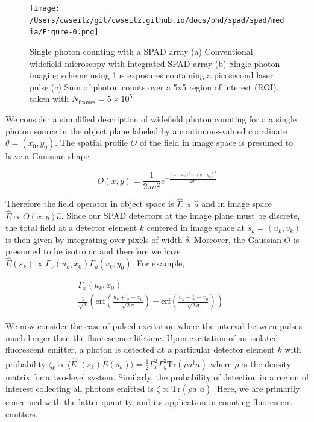 \begin{figure}[t]
\centering
\texttt{[image: /Users/cwseitz/git/cwseitz.github.io/docs/phd/spad/spad/media/Figure-0.png]}
\caption{Single photon counting with a SPAD array (a) Conventional widefield microscopy with integrated SPAD array (b) Single photon imaging scheme using 1us exposures containing a picosecond laser pulse (c) Sum of photon counts over a 5x5 region of interest (ROI), taken with $N_{\mathrm{frames}}=5\times 10^{5}$}
\end{figure}    

We consider a simplified description of widefield photon counting for a a single photon source in the object plane labeled by a continuous-valued coordinate $\theta=(x_0,y_0)$. The spatial profile $O$ of the field in image space is presumed to have a Gaussian shape \parencite{Zhang2007,Richards1959,Gibson1989}.

\begin{equation}
O(x,y) = \frac{1}{2\pi\sigma^{2}}e^{-\frac{(x-x_{0})^2+(y-y_{0})^2}{2\sigma^2}}
\end{equation}

Therefore the field operator in object space is $\hat{E} \propto \hat{a}$ and in image space $\hat{E} \propto O(x,y)\hat{a}$. Since our SPAD detectors at the image plane must be discrete, the total field at a detector element $k$ centered in image space at $s_k=(u_k,v_k)$ is then given by integrating over pixels of width $\delta$. Moreover, the Gaussian $O$ is presumed to be isotropic and therefore we have $\hat{E}(s_k) \propto \Gamma_{x}(u_k,x_{0})\Gamma_{y}(v_k,y_0)$. For example,

\begin{align*}
\Gamma_{x}(u_k,x_{0}) &= \\ \frac{1}{\sqrt{2}}\left(\mathrm{erf}\left(\frac{u_k+\frac{1}{2}-x_{0}}{\sqrt{2}\sigma}\right) -\mathrm{erf}\left(\frac{u_k-\frac{1}{2}-x_0}{\sqrt{2}\sigma}\right)\right)
\end{align*}

We now consider the case of pulsed excitation where the interval between pulses much longer than the fluorescence lifetime. Upon excitation of an isolated fluorescent emitter, a photon is detected at a particular detector element $k$ with probability $\zeta_k \propto \langle \hat{E}^{\dagger}(s_k)\hat{E}(s_k)\rangle = \frac{1}{2}\Gamma_{x}^2 \Gamma_{y}^2\mathrm{Tr}(\rho a^{\dagger}a)$ where $\rho$ is the density matrix for a two-level system. Similarly, the probability of detection in a region of interest collecting all photons emitted is $\zeta\propto \mathrm{Tr}(\rho a^{\dagger}a)$. Here, we are primarily concerned with the latter quantity, and its application in counting fluorescent emitters.

